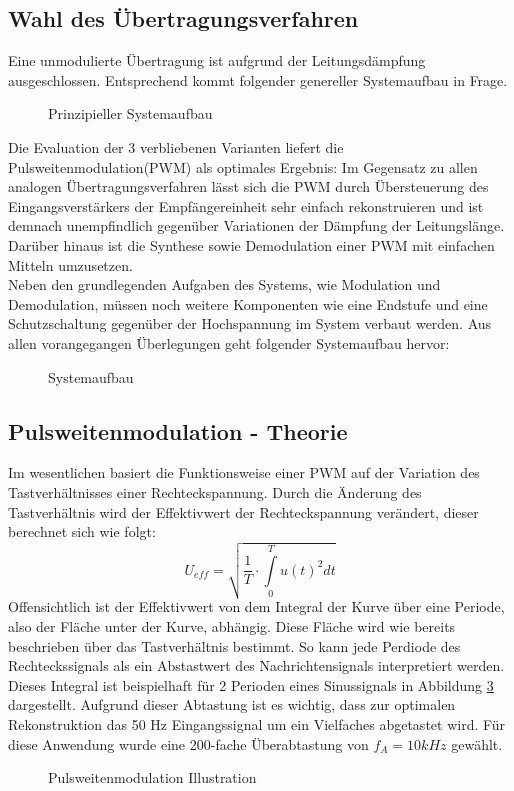 \subsection{Wahl des Übertragungsverfahren}
Eine unmodulierte Übertragung ist aufgrund der Leitungsdämpfung ausgeschlossen. Entsprechend kommt folgender genereller Systemaufbau in Frage.
\begin{figure}[H]
\centering
  
  \caption{Prinzipieller Systemaufbau}
  \label{fig:psystem}
\end{figure}
Die Evaluation der 3 verbliebenen Varianten liefert die Pulsweitenmodulation(PWM) als optimales Ergebnis:
Im Gegensatz zu allen analogen Übertragungsverfahren lässt sich die PWM durch Übersteuerung des Eingangsverstärkers der Empfängereinheit sehr einfach rekonstruieren und ist demnach unempfindlich gegenüber Variationen der Dämpfung der Leitungslänge. Darüber hinaus ist die Synthese sowie Demodulation einer PWM mit einfachen Mitteln umzusetzen.\\
Neben den grundlegenden Aufgaben des Systems, wie Modulation und Demodulation, müssen noch weitere Komponenten wie eine Endstufe und eine Schutzschaltung gegenüber der Hochspannung im System verbaut werden. 
Aus allen vorangegangen Überlegungen geht folgender Systemaufbau hervor: 
\begin{figure}[H]
  \centering
  
  \caption{Systemaufbau}
  \label{fig:system}
\end{figure}

\subsection{Pulsweitenmodulation - Theorie}
Im wesentlichen basiert die Funktionsweise einer PWM auf der Variation des Tastverhältnisses einer Rechteckspannung. Durch die Änderung des Tastverhältnis wird der Effektivwert der Rechteckspannung verändert, dieser berechnet sich wie folgt:\\
\begin{equation}
 U_{eff} = \sqrt{\frac{1}{T}\cdot\int\limits_{0}^T u(t)^2 dt}
\end{equation}
Offensichtlich ist der Effektivwert von dem Integral der Kurve über eine Periode, also der Fläche unter der Kurve, abhängig. Diese Fläche wird wie bereits beschrieben über das Tastverhältnis bestimmt. So kann jede Perdiode des Rechteckssignals als ein Abstastwert des Nachrichtensignals interpretiert werden. Dieses Integral ist beispielhaft für 2 Perioden eines Sinussignals in Abbildung \ref{fig:pwmArea} dargestellt. Aufgrund dieser Abtastung ist es wichtig, dass zur optimalen Rekonstruktion das 50 Hz Eingangssignal um ein Vielfaches abgetastet wird. Für diese Anwendung wurde eine 200-fache Überabtastung von $f_A=10kHz$ gewählt.
\begin{figure}[H]
  \centering
   \scalebox{0.6}{\begin{Large}
   
   \end{Large}}
   \caption{Pulsweitenmodulation Illustration}
  \label{fig:pwmArea}
\end{figure}

\newpage

